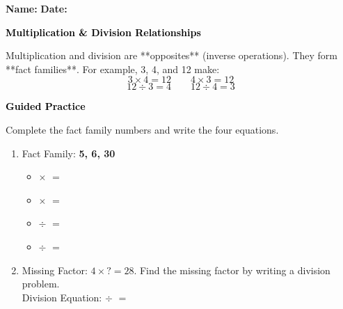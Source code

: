 \documentclass[12pt, letterpaper, fleqn]{article}
\newcommand{\blank}{\underline{\hspace{2.2cm}}}
\begin{document}
\textbf{Name:} \underline{\hspace{5cm}}
\hfill
\textbf{Date:} \underline{\hspace{3cm}}\\

\begin{tcolorbox}[colback=customteal!20]
    \large\textcolor{black}{\textbf{Multiplication & Division Relationships}}
\end{tcolorbox}

\vspace{3mm}
\noindent
Multiplication and division are **opposites** (inverse operations). 
They form **fact families**. For example, 3, 4, and 12 make:
\[
3 \times 4 = 12 \qquad 4 \times 3 = 12
\]
\[
12 \div 3 = 4 \qquad 12 \div 4 = 3
\]

\vspace{3mm}
\begin{center}
\end{center}

\newpage
\begin{tcolorbox}[colback=customteal!20]
    \large\textcolor{black}{\textbf{Guided Practice}}
\end{tcolorbox}

\vspace{5mm}
\noindent
Complete the fact family numbers and write the four equations.

\vspace{8mm}
\begin{enumerate}[itemsep=3cm, leftmargin=0.6cm]
\item Fact Family: \textbf{5, 6, 30}
\begin{itemize}
  \item \blank $\times$ \blank $=$ \blank
  \item \blank $\times$ \blank $=$ \blank
  \item \blank $\div$ \blank $=$ \blank
  \item \blank $\div$ \blank $=$ \blank
\end{itemize}

\item Missing Factor: $4 \times \textsf{?} = 28$. Find the missing factor by writing a division problem.
\\
Division Equation: \blank $\div$ \blank $=$ \blank
\end{enumerate}
\end{document}

